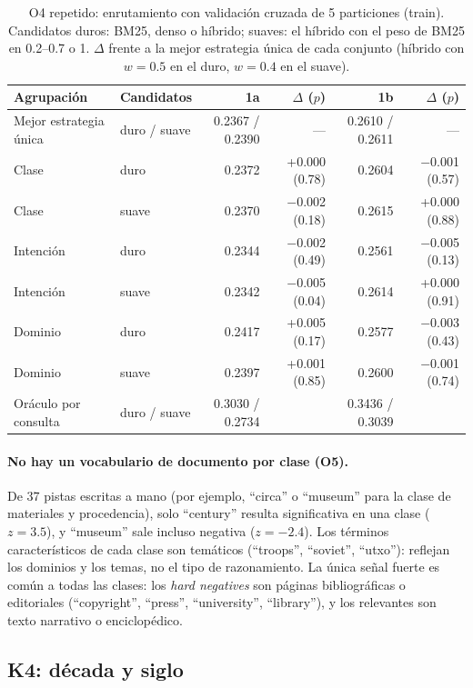 \documentclass[11pt,a4paper]{article}
\begin{document}
\begin{table}[t]
\centering
\caption{O4 repetido: enrutamiento con validación cruzada de 5 particiones (train). Candidatos duros: BM25, denso o híbrido; suaves: el híbrido con el peso de BM25 en 0.2--0.7 o 1. $\Delta$ frente a la mejor estrategia única de cada conjunto (híbrido con $w = 0.5$ en el duro, $w = 0.4$ en el suave).}
\label{tab:o4}
\footnotesize
\setlength{\tabcolsep}{4pt}
\begin{tabular}{llrrrr}
\toprule
Agrupación & Candidatos & 1a & $\Delta$ ($p$) & 1b & $\Delta$ ($p$) \\
\midrule
Mejor estrategia única & duro / suave & 0.2367 / 0.2390 & --- & 0.2610 / 0.2611 & --- \\
Clase & duro & 0.2372 & +0.000 (0.78) & 0.2604 & $-$0.001 (0.57) \\
Clase & suave & 0.2370 & $-$0.002 (0.18) & 0.2615 & +0.000 (0.88) \\
Intención & duro & 0.2344 & $-$0.002 (0.49) & 0.2561 & $-$0.005 (0.13) \\
Intención & suave & 0.2342 & $-$0.005 (0.04) & 0.2614 & +0.000 (0.91) \\
Dominio & duro & 0.2417 & +0.005 (0.17) & 0.2577 & $-$0.003 (0.43) \\
Dominio & suave & 0.2397 & +0.001 (0.85) & 0.2600 & $-$0.001 (0.74) \\
\midrule
Oráculo por consulta & duro / suave & 0.3030 / 0.2734 & & 0.3436 / 0.3039 & \\
\bottomrule
\end{tabular}
\end{table}

\paragraph{No hay un vocabulario de documento por clase (O5).} De 37 pistas escritas a mano (por ejemplo, ``circa'' o ``museum'' para la clase de materiales y procedencia), solo ``century'' resulta significativa en una clase ($z = 3.5$), y ``museum'' sale incluso negativa ($z = -2.4$). Los términos característicos de cada clase son temáticos (``troops'', ``soviet'', ``utxo''): reflejan los dominios y los temas, no el tipo de razonamiento. La única señal fuerte es común a todas las clases: los \emph{hard negatives} son páginas bibliográficas o editoriales (``copyright'', ``press'', ``university'', ``library''), y los relevantes son texto narrativo o enciclopédico.

\subsection{K4: década y siglo}
\label{sec:res-k4}
\end{document}
